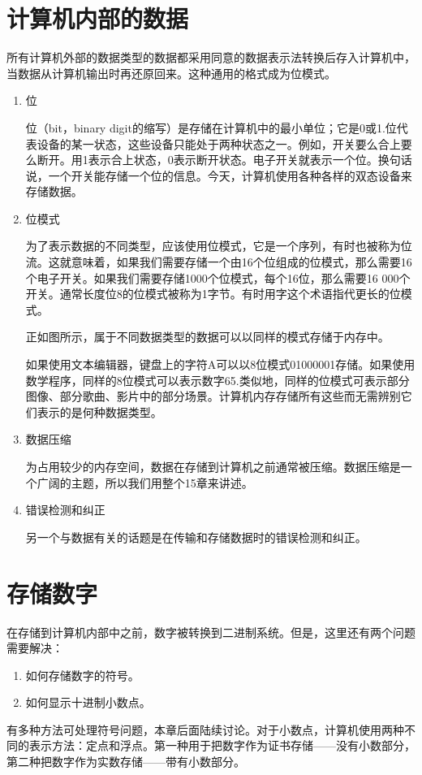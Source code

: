 \section{计算机内部的数据}
所有计算机外部的数据类型的数据都采用同意的数据表示法转换后存入计算机中，当数据从计算机输出时再还原回来。这种通用的格式成为位模式。
\begin{enumerate}
	\item 位

	位（bit，binary digit的缩写）是存储在计算机中的最小单位；它是0或1.位代表设备的某一状态，这些设备只能处于两种状态之一。例如，开关要么合上要么断开。用1表示合上状态，0表示断开状态。电子开关就表示一个位。换句话说，一个开关能存储一个位的信息。今天，计算机使用各种各样的双态设备来存储数据。
	\item 位模式

	为了表示数据的不同类型，应该使用位模式，它是一个序列，有时也被称为位流。这就意味着，如果我们需要存储一个由16个位组成的位模式，那么需要16个电子开关。如果我们需要存储1000个位模式，每个16位，那么需要16 000个开关。通常长度位8的位模式被称为1字节。有时用字这个术语指代更长的位模式。

	正如图所示，属于不同数据类型的数据可以以同样的模式存储于内存中。

	如果使用文本编辑器，键盘上的字符A可以以8位模式01000001存储。如果使用数学程序，同样的8位模式可以表示数字65.类似地，同样的位模式可表示部分图像、部分歌曲、影片中的部分场景。计算机内存存储所有这些而无需辨别它们表示的是何种数据类型。
	\item 数据压缩

	为占用较少的内存空间，数据在存储到计算机之前通常被压缩。数据压缩是一个广阔的主题，所以我们用整个15章来讲述。
	\item 错误检测和纠正

	另一个与数据有关的话题是在传输和存储数据时的错误检测和纠正。
\end{enumerate}
\section{存储数字}
在存储到计算机内部中之前，数字被转换到二进制系统。但是，这里还有两个问题需要解决：
\begin{enumerate}
	\item 如何存储数字的符号。
	\item 如何显示十进制小数点。
\end{enumerate}
有多种方法可处理符号问题，本章后面陆续讨论。对于小数点，计算机使用两种不同的表示方法：定点和浮点。第一种用于把数字作为证书存储——没有小数部分，第二种把数字作为实数存储——带有小数部分。
